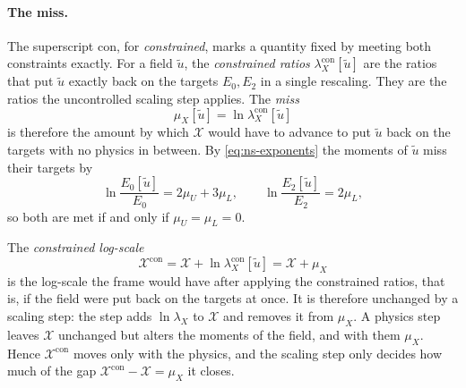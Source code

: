 \documentclass{article}
\begin{document}
\paragraph{The miss.}
The superscript $\mathrm{con}$, for \emph{constrained}, marks a quantity
fixed by meeting both constraints exactly. For a field $\tilde u$, the
\emph{constrained ratios} $\lambda_X^{\mathrm{con}}[\tilde u]$ are the ratios
that put $\tilde u$ exactly back on the targets $E_0, E_2$ in a single
rescaling. They are the ratios the uncontrolled
scaling step applies. The \emph{miss}
\begin{equation}\label{eq:ns-sr-miss-def}
  \mu_X[\tilde u] = \ln \lambda_X^{\mathrm{con}}[\tilde u]
\end{equation}
is therefore the amount by which $\mathcal{X}$ would have to advance to put
$\tilde u$ back on the targets with no physics in between. By \eqref{eq:ns-exponents}
the moments of $\tilde u$ miss their targets by
\begin{equation}\label{eq:ns-sr-moments}
  \ln \frac{E_0[\tilde u]}{E_0} = 2 \mu_U + 3 \mu_L,
  \qquad
  \ln \frac{E_2[\tilde u]}{E_2} = 2 \mu_L,
\end{equation}
so both are met if and only if $\mu_U = \mu_L = 0$.\par
The \emph{constrained log-scale}
\begin{equation}\label{eq:ns-sr-con}
  \mathcal{X}^{\mathrm{con}} = \mathcal{X} + \ln \lambda_X^{\mathrm{con}}[\tilde u]
  = \mathcal{X} + \mu_X
\end{equation}
is the log-scale the frame would have after applying the constrained ratios,
that is, if the field were put back on the targets at once. It is therefore
unchanged by a scaling step: the step adds
$\ln \lambda_X$ to $\mathcal{X}$ and removes it from $\mu_X$. A physics step
leaves $\mathcal{X}$ unchanged but alters the moments of the field, and with
them $\mu_X$. Hence $\mathcal{X}^{\mathrm{con}}$ moves only with the physics,
and the scaling step only decides how much of the gap
$\mathcal{X}^{\mathrm{con}} - \mathcal{X} = \mu_X$ it closes. 
\end{document}
